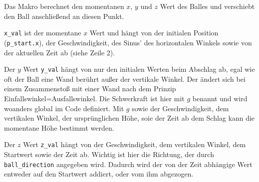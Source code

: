 Das Makro berechnet den momentanen $x$, $y$ und $z$ Wert des Balles und verschiebt den Ball anschließend an diesen Punkt. 

\texttt{x\_val} ist der momentane $x$ Wert und hängt von der initialen Position (\texttt{p\_start.x}), der Geschwindigkeit, des Sinus' des horizontalen Winkels sowie von der aktuellen Zeit ab (siehe Zeile 2).

Der $y$ Wert \texttt{y\_val} hängt von nur den initialen Werten beim Abschlag ab, egal wie oft der Ball eine Wand berührt außer der vertikale Winkel. Der ändert sich bei einem Zusammenstoß mit einer Wand nach dem Prinzip Einfallswinkel=Ausfallswinkel. Die Schwerkraft ist hier mit $g$ benannt und wird woanders global im Code definiert. Mit $g$ sowie der Geschwindigkeit, dem vertikalen Winkel, der ursprünglichen Höhe, soie der Zeit ab dem Schlag kann die momentane Höhe bestimmt werden.

Der $z$ Wert \texttt{z\_val} hängt von der Geschwindigkeit, dem vertikalen Winkel, dem Startwert sowie der Zeit ab. Wichtig ist hier die Richtung, der durch \texttt{ball\_direction} angegeben wird. Dadurch wird der von der Zeit abhängige Wert entweder auf den Startwert addiert, oder vom ihm abgezogen.

